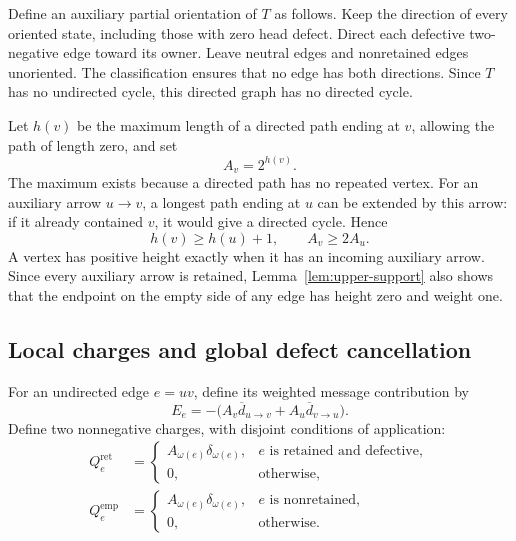 Define an auxiliary partial orientation of $T$ as follows.  Keep the direction
of every oriented state, including those with zero head defect.  Direct each
defective two-negative edge toward its owner.  Leave neutral edges and
nonretained edges unoriented.  The classification ensures that no edge has
both directions.  Since $T$ has no undirected cycle, this directed graph has
no directed cycle.

Let $h(v)$ be the maximum length of a directed path ending at $v$, allowing
the path of length zero, and set
\begin{equation}\label{eq:upper-weights}
 A_v=2^{h(v)}.
\end{equation}
The maximum exists because a directed path has no repeated vertex.
For an auxiliary arrow $u\to v$, a longest path ending at $u$ can be
extended by this arrow: if it already contained $v$, it would give a
directed cycle.  Hence
\begin{equation}\label{eq:upper-doubling}
 h(v)\geq h(u)+1,\qquad A_v\geq2A_u.
\end{equation}
A vertex has positive height exactly when it has an incoming auxiliary
arrow.  Since every auxiliary arrow is retained, Lemma~\ref{lem:upper-support}
also shows that the endpoint on the empty side of any edge has height zero
and weight one.

\subsection{Local charges and global defect cancellation}

For an undirected edge $e=uv$, define its weighted message contribution by
\[
 E_e=-\bigl(A_v\overline d_{u\to v}
             +A_u\overline d_{v\to u}\bigr).
\]
Define two nonnegative charges, with disjoint conditions of application:
\begin{align*}
 Q_e^{\mathrm{ret}}
  &=\begin{cases}
     A_{\omega(e)}\delta_{\omega(e)},&e\text{ is retained and defective},\\
     0,&\text{otherwise},
    \end{cases}\\
 Q_e^{\mathrm{emp}}
  &=\begin{cases}
     A_{\omega(e)}\delta_{\omega(e)},&e\text{ is nonretained},\\
     0,&\text{otherwise}.
    \end{cases}
\end{align*}

